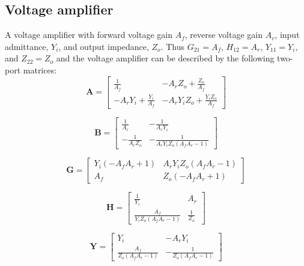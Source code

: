 \documentclass[a4paper, 12pt]{article}
\newcommand{\mat}[1]{\mathbf{#1}}
\begin{document}
\subsection{Voltage amplifier}

A voltage amplifier with forward voltage gain $A_f$, reverse voltage
gain $A_r$, input admittance, $Y_i$, and output impedance, $Z_o$.
Thus $G_{21} = A_f$, $H_{12} = A_r$, $Y_{11} = Y_i$, and $Z_{22} =
Z_o$ and the voltage amplifier can be described by the following
two-port matrices:
%
\begin{equation}
\mat{A} = \left[\begin{matrix}\frac{1}{A_{f}} & - A_{r} Z_{o} + \frac{Z_{o}}{A_{f}}\\- A_{r} Y_{i} + \frac{Y_{i}}{A_{f}} & - A_{r} Y_{i} Z_{o} + \frac{Y_{i} Z_{o}}{A_{f}}\end{matrix}\right]
\end{equation}

\begin{equation}
\mat{B} = \left[\begin{matrix}\frac{1}{A_{r}} & - \frac{1}{A_{r} Y_{i}}\\- \frac{1}{A_{r} Z_{o}} & - \frac{1}{A_{r} Y_{i} Z_{o} \left(A_{f} A_{r} - 1\right)}\end{matrix}\right]
\end{equation}

\begin{equation}
\mat{G} = \left[\begin{matrix}Y_{i} \left(- A_{f} A_{r} + 1\right) & A_{r} Y_{i} Z_{o} \left(A_{f} A_{r} - 1\right)\\A_{f} & Z_{o} \left(- A_{f} A_{r} + 1\right)\end{matrix}\right]
\end{equation}

\begin{equation}
\mat{H} = \left[\begin{matrix}\frac{1}{Y_{i}} & A_{r}\\\frac{A_{f}}{Y_{i} Z_{o} \left(A_{f} A_{r} - 1\right)} & \frac{1}{Z_{o}}\end{matrix}\right]
\end{equation}

\begin{equation}
\mat{Y} = \left[\begin{matrix}Y_{i} & - A_{r} Y_{i}\\\frac{A_{f}}{Z_{o} \left(A_{f} A_{r} - 1\right)} & - \frac{1}{Z_{o} \left(A_{f} A_{r} - 1\right)}\end{matrix}\right]
\end{equation}
\end{document}
